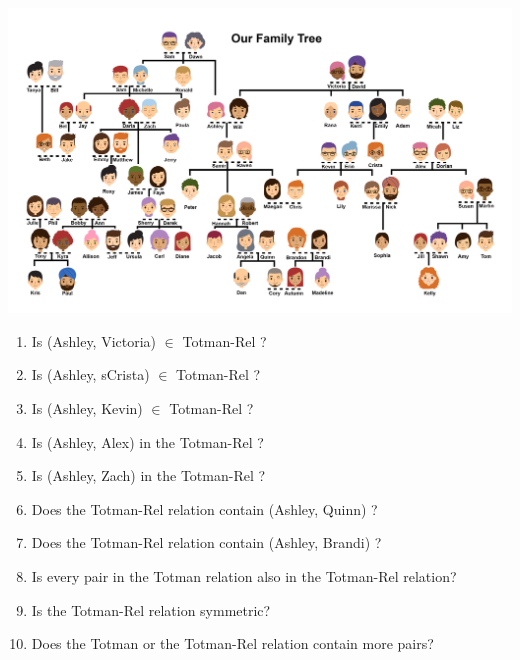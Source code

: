 \documentclass{ximera}
\begin{document}
\begin{exercise}
\quad \\
\begin{center}
\begin{image}
\includegraphics{Totman_Family_Tree.png}
\end{image}
\end{center}
\begin{enumerate}
\item Is (Ashley, Victoria) $\in$ Totman-Rel ? 
\item Is (Ashley, sCrista) $\in$ Totman-Rel ?
\item Is (Ashley, Kevin) $\in$ Totman-Rel ?
\item Is (Ashley, Alex) in the  Totman-Rel ?
\item Is (Ashley, Zach) in the  Totman-Rel ?
\item Does the Totman-Rel relation contain (Ashley, Quinn) ?
\item Does the Totman-Rel relation contain (Ashley, Brandi) ?
\item Is every pair in the Totman relation also in the Totman-Rel relation?
\item Is the Totman-Rel relation symmetric?
\item Does the Totman or the Totman-Rel relation contain more pairs?
\end{enumerate}

\end{exercise}
\end{document}
